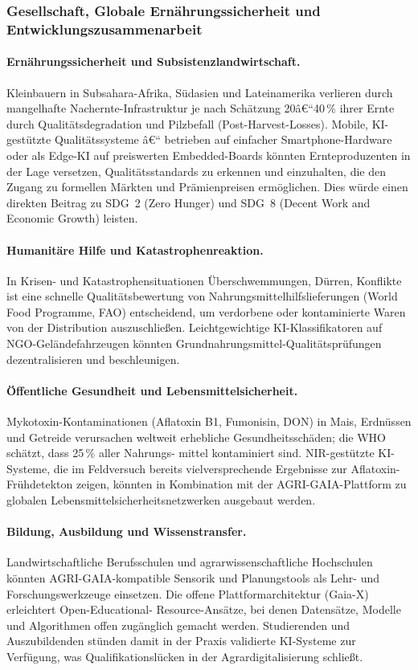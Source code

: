 \documentclass[a4paper, 12pt, twoside, openright]{report}
\theoremstyle{definition}
\theoremstyle{definition}
\begin{document}
\subsubsection{Gesellschaft, Globale Ernährungssicherheit und Entwicklungszusammenarbeit}

\paragraph{Ernährungssicherheit und Subsistenzlandwirtschaft.}
Kleinbauern in Subsahara-Afrika, Südasien und Lateinamerika verlieren
durch mangelhafte Nachernte-Infrastruktur je nach Schätzung
20â€“40\,\% ihrer Ernte durch Qualitätsdegradation und Pilzbefall
(Post-Harvest-Losses). Mobile, KI-gestützte Qualitätssysteme â€“
betrieben auf einfacher Smart\-phone-Hardware oder als Edge-KI auf
preiswerten Embedded-Boards könnten Ernteproduzenten in der
Lage versetzen, Qualitätsstandards zu erkennen und einzuhalten,
die den Zugang zu formellen Märkten und Prämienpreisen ermöglichen.
Dies würde einen direkten Beitrag zu SDG~2 (Zero Hunger) und SDG~8
(Decent Work and Economic Growth) leisten.

\paragraph{Humanitäre Hilfe und Katastrophenreaktion.}
In Krisen- und Katastrophensituationen Überschwemmungen, Dürren,
Konflikte ist eine schnelle Qualitätsbewertung von
Nahrungsmittelhilfslieferungen (World Food Programme, FAO)
entscheidend, um verdorbene oder kontaminierte Waren von der
Distribution auszuschließen. Leichtgewichtige KI-Klassifikatoren
auf NGO-Geländefahrzeugen könnten Grundnahrungsmittel-Qualitätsprüfungen
dezentralisieren und beschleunigen.

\paragraph{Öffentliche Gesundheit und Lebensmittelsicherheit.}
Mykotoxin-Kontaminationen (Aflatoxin B1, Fumonisin, DON) in Mais,
Erdnüssen und Getreide verursachen weltweit erhebliche
Gesundheitsschäden; die WHO schätzt, dass 25\,\% aller Nahrungs-
mittel kontaminiert sind. NIR-gestützte KI-Systeme, die im
Feldversuch bereits vielversprechende Ergebnisse zur
Aflatoxin-Frühdetekton zeigen, könnten in Kombination mit der
AGRI-GAIA-Plattform zu globalen Lebensmittelsicherheitsnetzwerken
ausgebaut werden.

\paragraph{Bildung, Ausbildung und Wissenstransfer.}
Landwirtschaftliche Berufsschulen und agrarwissen\-schaftliche
Hochschulen könnten AGRI-GAIA-kompatible Sensorik und Planungstools
als Lehr- und Forschungswerkzeuge einsetzen. Die offene
Plattformarchitektur (Gaia-X) erleichtert Open-Educational-
Resource-Ansätze, bei denen Datensätze, Modelle und
Algorithmen offen zugänglich gemacht werden. Studierenden
und Auszubildenden stünden damit in der Praxis validierte
KI-Systeme zur Verfügung, was Qualifikationslücken in der
Agrardigitalisierung schließt.
\end{document}
